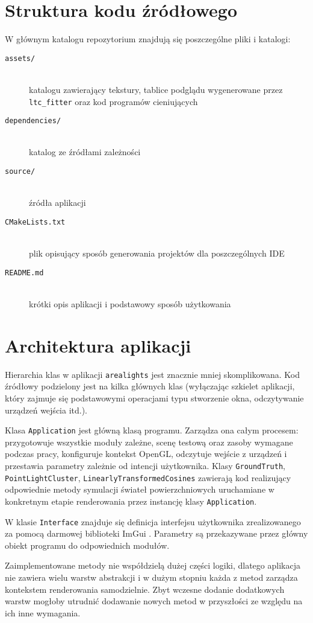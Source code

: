 \documentclass[../main.tex]{subfiles}
\begin{document}
\section{Struktura kodu źródłowego}

W głównym katalogu repozytorium znajdują się poszczególne pliki i katalogi:

\begin{description}
    \item[\texttt{assets/}] \hfill \\ 
    katalogu zawierający tekstury, tablice podglądu wygenerowane przez \texttt{ltc\_fitter} oraz kod programów cieniujących
    
    \item[\texttt{dependencies/}] \hfill \\ 
    katalog ze źródłami zależności
    
    \item[\texttt{source/}] \hfill \\ źródła aplikacji
    
    \item[\texttt{CMakeLists.txt}] \hfill\\ 
    plik opisujący sposób generowania projektów dla poszczególnych IDE 

    \item[\texttt{README.md}] \hfill\\ 
    krótki opis aplikacji i podstawowy sposób użytkowania 
    
\end{description}

\section{Architektura aplikacji}

Hierarchia klas w aplikacji \texttt{arealights} jest znacznie mniej skomplikowana. Kod źródłowy podzielony jest na kilka głównych klas (wyłączając szkielet aplikacji, który zajmuje się podstawowymi operacjami typu stworzenie okna, odczytywanie urządzeń wejścia itd.).

Klasa \texttt{Application} jest główną klasą programu. Zarządza ona całym procesem: przygotowuje wszystkie moduły zależne, scenę testową oraz zasoby wymagane podczas pracy, konfiguruje kontekst OpenGL, odczytuje wejście z urządzeń i przestawia parametry zależnie od intencji użytkownika. Klasy \texttt{GroundTruth}, \texttt{PointLightCluster}, \texttt{LinearlyTransformedCosines} zawierają kod realizujący odpowiednie metody symulacji świateł powierzchniowych uruchamiane w konkretnym etapie renderowania przez instancję klasy \texttt{Application}.

W klasie \texttt{Interface} znajduje się definicja interfejsu użytkownika zrealizowanego za pomocą darmowej biblioteki ImGui \cite{ImGui}. Parametry są przekazywane przez główny obiekt programu do odpowiednich modułów.

Zaimplementowane metody nie współdzielą dużej części logiki, dlatego aplikacja nie zawiera wielu warstw abstrakcji i w dużym stopniu każda z metod zarządza kontekstem renderowania samodzielnie. Zbyt wczesne dodanie dodatkowych warstw mogłoby utrudnić dodawanie nowych metod w przyszłości ze względu na ich inne wymagania.
\end{document}
